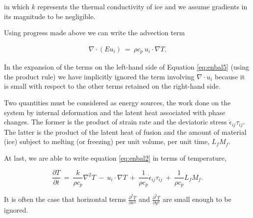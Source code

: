 in which $k$ represents the thermal conductivity of ice and we assume
gradients in its magnitude to be negligible. 

Using progress made above we can write the advection term

\begin{equation}
\begin{matrix}
\nabla \cdot \left(E u_{i} \right)~=~\rho c_{p}~ u_{i} \cdot \nabla T. 
\end{matrix}
\label{eq:enbal5}
\end{equation}

In the expansion of the terms on the left-hand side of Equation \eqref{eq:enbal5} (using the product rule) we 
have implicitly ignored the term involving $\nabla \cdot u_{i}$ because it is small with respect to the other terms
retained on the right-hand side.

Two quantities must be considered as energy sources, the work done on
the system by internal deformation and the latent heat associated with
phase changes. The former is the product of strain rate and the
deviatoric stress $\dot{\epsilon}_{ij} \tau_{ij}$. The latter is the
product of the latent heat of fusion and the amount of material (ice) subject
to melting (or freezing) per unit volume, per unit time, $L_{f}M_{f}$.

At last, we are able to write equation \eqref{eq:enbal2} in terms of temperature,

\begin{equation}
\frac{\partial T}{\partial t}~=~\frac{k}{\rho c_{p}} \nabla^{2}T~-~u_{i}\cdot \nabla T~+~\frac{1}{\rho c_{p}} \dot{\epsilon}_{ij} \tau_{ij} ~+~\frac{1}{\rho c_{p}} L_{f} M_{f}.
\label{eq:enbal6}
\end{equation}

It is often the case that horizontal terms
$\frac{\partial^{2} T}{\partial x^{2}}$ and
$\frac{\partial^{2} T}{\partial y^{2}}$ are small enough to be ignored.
